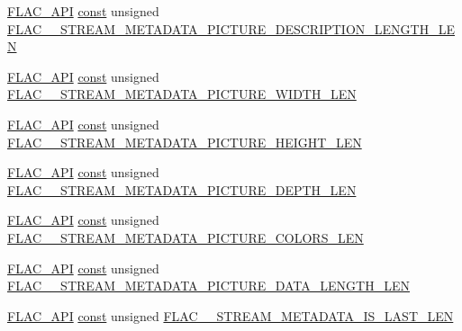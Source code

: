 \begin{DoxyCompactItemize}
\hyperlink{group__flac__export_ga56ca07df8a23310707732b1c0007d6f5}{F\+L\+A\+C\+\_\+\+A\+PI} \hyperlink{zconf_8h_a2c212835823e3c54a8ab6d95c652660e}{const} unsigned \hyperlink{group__flac__format_gab3a293664bc479d1a1367631d7b776f7}{F\+L\+A\+C\+\_\+\+\_\+\+S\+T\+R\+E\+A\+M\+\_\+\+M\+E\+T\+A\+D\+A\+T\+A\+\_\+\+P\+I\+C\+T\+U\+R\+E\+\_\+\+D\+E\+S\+C\+R\+I\+P\+T\+I\+O\+N\+\_\+\+L\+E\+N\+G\+T\+H\+\_\+\+L\+EN}
\item 
\hyperlink{group__flac__export_ga56ca07df8a23310707732b1c0007d6f5}{F\+L\+A\+C\+\_\+\+A\+PI} \hyperlink{zconf_8h_a2c212835823e3c54a8ab6d95c652660e}{const} unsigned \hyperlink{group__flac__format_ga4e7491ae179e5c713e2246ac80cf36e6}{F\+L\+A\+C\+\_\+\+\_\+\+S\+T\+R\+E\+A\+M\+\_\+\+M\+E\+T\+A\+D\+A\+T\+A\+\_\+\+P\+I\+C\+T\+U\+R\+E\+\_\+\+W\+I\+D\+T\+H\+\_\+\+L\+EN}
\item 
\hyperlink{group__flac__export_ga56ca07df8a23310707732b1c0007d6f5}{F\+L\+A\+C\+\_\+\+A\+PI} \hyperlink{zconf_8h_a2c212835823e3c54a8ab6d95c652660e}{const} unsigned \hyperlink{group__flac__format_gab072f764d249b491b42514c8a1d18d22}{F\+L\+A\+C\+\_\+\+\_\+\+S\+T\+R\+E\+A\+M\+\_\+\+M\+E\+T\+A\+D\+A\+T\+A\+\_\+\+P\+I\+C\+T\+U\+R\+E\+\_\+\+H\+E\+I\+G\+H\+T\+\_\+\+L\+EN}
\item 
\hyperlink{group__flac__export_ga56ca07df8a23310707732b1c0007d6f5}{F\+L\+A\+C\+\_\+\+A\+PI} \hyperlink{zconf_8h_a2c212835823e3c54a8ab6d95c652660e}{const} unsigned \hyperlink{group__flac__format_gaf353f5e8c2a50d00e77f31b97fda078e}{F\+L\+A\+C\+\_\+\+\_\+\+S\+T\+R\+E\+A\+M\+\_\+\+M\+E\+T\+A\+D\+A\+T\+A\+\_\+\+P\+I\+C\+T\+U\+R\+E\+\_\+\+D\+E\+P\+T\+H\+\_\+\+L\+EN}
\item 
\hyperlink{group__flac__export_ga56ca07df8a23310707732b1c0007d6f5}{F\+L\+A\+C\+\_\+\+A\+PI} \hyperlink{zconf_8h_a2c212835823e3c54a8ab6d95c652660e}{const} unsigned \hyperlink{group__flac__format_ga3eb701d8a4cfab5c6b6e778a7a15cc95}{F\+L\+A\+C\+\_\+\+\_\+\+S\+T\+R\+E\+A\+M\+\_\+\+M\+E\+T\+A\+D\+A\+T\+A\+\_\+\+P\+I\+C\+T\+U\+R\+E\+\_\+\+C\+O\+L\+O\+R\+S\+\_\+\+L\+EN}
\item 
\hyperlink{group__flac__export_ga56ca07df8a23310707732b1c0007d6f5}{F\+L\+A\+C\+\_\+\+A\+PI} \hyperlink{zconf_8h_a2c212835823e3c54a8ab6d95c652660e}{const} unsigned \hyperlink{group__flac__format_ga30354d7318c03c9b272554eeb7d28719}{F\+L\+A\+C\+\_\+\+\_\+\+S\+T\+R\+E\+A\+M\+\_\+\+M\+E\+T\+A\+D\+A\+T\+A\+\_\+\+P\+I\+C\+T\+U\+R\+E\+\_\+\+D\+A\+T\+A\+\_\+\+L\+E\+N\+G\+T\+H\+\_\+\+L\+EN}
\item 
\hyperlink{group__flac__export_ga56ca07df8a23310707732b1c0007d6f5}{F\+L\+A\+C\+\_\+\+A\+PI} \hyperlink{zconf_8h_a2c212835823e3c54a8ab6d95c652660e}{const} unsigned \hyperlink{group__flac__format_ga52249514c52427990483b9f5a0ca7f93}{F\+L\+A\+C\+\_\+\+\_\+\+S\+T\+R\+E\+A\+M\+\_\+\+M\+E\+T\+A\+D\+A\+T\+A\+\_\+\+I\+S\+\_\+\+L\+A\+S\+T\+\_\+\+L\+EN}

\end{DoxyCompactItemize}
